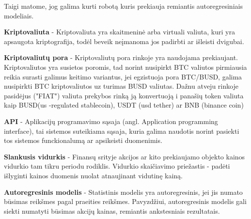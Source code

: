 \documentclass{VUMIFInfKursinis}
\begin{document}

Taigi matome, jog galima kurti robotą kuris prekiauja remiantis autoregresiniais modeliais.

\textbf{Kriptovaliuta} - Kriptovaliuta yra skaitmeninė arba virtuali valiuta, kuri yra apsaugota kriptografija, todėl beveik neįmanoma jos padirbti ar išleisti dvigubai.

\textbf{Kriptovaliutų pora} - Kriptovaliutų pora rinkoje yra naudojama prekiaujant. Kriptovaliutos yra susietos poromis, tad norint nusipirkt BTC valiutos pirmiausia reikia surasti 
galimus keitimo variantus, jei egzistuoja pora BTC/BUSD, galima nusipirkti BTC kriptovaliutos uz turimas BUSD valiutas. Dažnu atveju rinkoje pasidėjus ("FIAT") valiuta
prekybos rinką ją konvertuoją i panašių token valiuta kaip BUSD(us -regulated stablecoin), USDT (usd tether) ar BNB (binance coin)

\textbf{API} - Aplikacijų programavimo sąsaja (angl. Application programming interface), tai sistemos suteikiama sąsaja, kuria galima naudotis norint pasiekti tos sistemos
funckionalumą ar apsikeisti duomenimis.

\textbf{Slankusis vidurkis} - Finansų srityje akcijos ar kito prekiaujamo objekto kainos vidurkio tam tikru periodu rodiklis. Vidurkio skaičiavimo priežastis - padėti išlyginti
kainos duomenis nuolat atnaujinant vidutinę kainą.

\textbf{Autoregresinis modelis} - Statistinis modelis yra autoregresinis, jei jis numato būsimas reikšmes pagal praeities reikšmes. Pavyzdžiui, autoregresinis modelis gali
siekti numatyti būsimas akcijų kainas, remiantis ankstesniais rezultatais.

\printbibliography[heading=bibintoc] %
\end{document}
